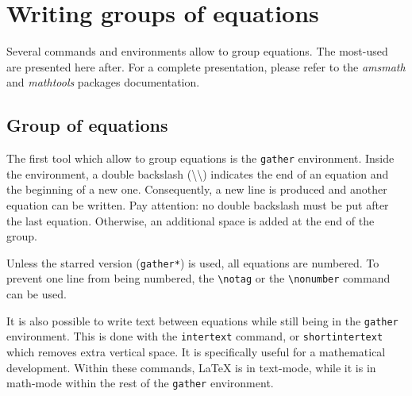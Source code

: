 	
	
\section{Writing groups of equations}


	Several commands and environments allow to group equations.
	The most-used are presented here after.
	For a complete presentation, please refer to the \emph{amsmath} and \emph{mathtools} packages documentation.
	
	
	
	\subsection{Group of equations}
	
	
		The first tool which allow to group equations is the \texttt{gather} environment.
		Inside the environment, a double backslash (\textbackslash\textbackslash) indicates the end of an equation and the beginning of a new one.
		Consequently, a new line is produced and another equation can be written.
		Pay attention: no double backslash must be put after the last equation.
		Otherwise, an additional space is added at the end of the group.
		
		
		Unless the starred version (\texttt{gather*}) is used, all equations are numbered.
		To prevent one line from being numbered, the \texttt{\textbackslash{}notag} or the \texttt{\textbackslash{}nonumber} command can be used.
		
		
		It is also possible to write text between equations while still being in the \texttt{gather} environment.
		This is done with the \texttt{intertext} command, or \texttt{shortintertext} which removes extra vertical space.
		It is specifically useful for a mathematical development.
		Within these commands, \LaTeX{} is in text-mode, while it is in math-mode within the rest of the \texttt{gather} environment.
		
